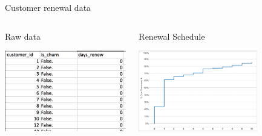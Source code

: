 \documentclass[10pt]{beamer}
\begin{document}
    \begin{frame}{Customer renewal data}
        \begin{columns}[c]
          \begin{block}{Raw data}
            \begin{center}
              \includegraphics[height=100pt]{../graphs/dataset_customer_renew}
            \end{center}
          \end{block}
          \begin{block}{Renewal Schedule}
            \begin{center}
              \includegraphics[height=100pt]{../graphs/dataset_renewal_schedule}
            \end{center}
          \end{block}
        \end{columns}
    \end{frame}
\end{document}
